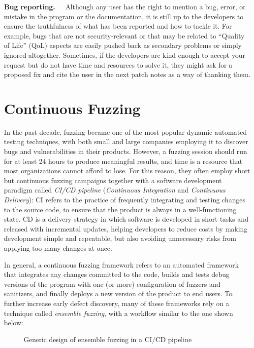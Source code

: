 \textbf{Bug reporting.}\ \ \ Although any user has the right to mention a bug, error, or mistake in the program or the documentation, it is still up to the developers to ensure the truthfulness of what has been reported and how to tackle it. For example, bugs that are not security-relevant or that may be related to ``Quality of Life'' (QoL) aspects are easily pushed back as secondary problems or simply ignored altogether. Sometimes, if the developers are kind enough to accept your request but do not have time and resources to solve it, they might ask for a proposed fix and cite the user in the next patch notes as a way of thanking them.



\newpage
\section{Continuous Fuzzing}
In the past decade, fuzzing became one of the most popular dynamic automated testing techniques, with both small and large companies employing it to discover bugs and vulnerabilities in their products. However, a fuzzing session should run for at least 24 hours \cite{evaluating_fuzz} to produce meaningful results, and time is a resource that most organizations cannot afford to lose. For this reason, they often employ short but continuous fuzzing campaigns together with a software development paradigm called \textit{CI/CD pipeline} (\textit{Continuous Integration} and \textit{Continuous Delivery}): CI refers to the practice of frequently integrating and testing changes to the source code, to ensure that the product is always in a well-functioning state. CD is a delivery strategy in which software is developed in short tasks and released with incremental updates, helping developers to reduce costs by making development simple and repeatable, but also avoiding unnecessary risks from applying too many changes at once. 

In general, a continuous fuzzing framework refers to an automated framework that integrates any changes committed to the code, builds and tests debug versions of the program with one (or more) configuration of fuzzers and sanitizers, and finally deploys a new version of the product to end users. To further increase early defect discovery, many of these frameworks rely on a technique called \textit{ensemble fuzzing}, with a workflow similar to the one shown below:

\begin{figure}[h]
\caption{Generic design of ensemble fuzzing in a CI/CD pipeline \cite{continuous_fuzzing}}
\label{fig:continuous_fuzzing}
\end{figure}

